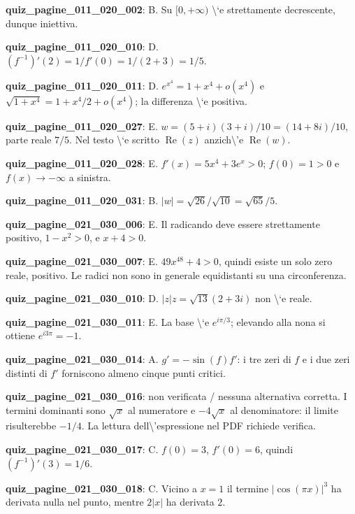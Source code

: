 \documentclass[11pt,a4paper]{article}
\newcounter{quiz}
\begin{document}
\noindent\textbf{quiz\_pagine\_011\_020\_002}: B. Su $[0,+\infty)$ \textbackslash{}`e strettamente decrescente, dunque iniettiva.\par\medskip
\noindent\textbf{quiz\_pagine\_011\_020\_010}: D. $(f^{-1})\prime(2)=1/f\prime(0)=1/(2+3)=1/5$.\par\medskip
\noindent\textbf{quiz\_pagine\_011\_020\_011}: D. $e^{x^4}=1+x^4+o(x^4)$ e $\sqrt{1+x^4}=1+x^4/2+o(x^4)$; la differenza \textbackslash{}`e positiva.\par\medskip
\noindent\textbf{quiz\_pagine\_011\_020\_027}: E. $w=(5+i)(3+i)/10=(14+8i)/10$, parte reale $7/5$. Nel testo \textbackslash{}`e scritto $\operatorname{Re}(z)$ anzich\textbackslash{}'e $\operatorname{Re}(w)$.\par\medskip
\noindent\textbf{quiz\_pagine\_011\_020\_028}: E. $f\prime(x)=5x^4+3e^x>0$; $f(0)=1>0$ e $f(x)\to-\infty$ a sinistra.\par\medskip
\noindent\textbf{quiz\_pagine\_011\_020\_031}: B. $|w|=\sqrt{26}/\sqrt{10}=\sqrt{65}/5$.\par\medskip
\noindent\textbf{quiz\_pagine\_021\_030\_006}: E. Il radicando deve essere strettamente positivo, $1-x^2>0$, e $x+4>0$.\par\medskip
\noindent\textbf{quiz\_pagine\_021\_030\_007}: E. $49x^{48}+4>0$, quindi esiste un solo zero reale, positivo. Le radici non sono in generale equidistanti su una circonferenza.\par\medskip
\noindent\textbf{quiz\_pagine\_021\_030\_010}: D. $|z|z=\sqrt{13}(2+3i)$ non \textbackslash{}`e reale.\par\medskip
\noindent\textbf{quiz\_pagine\_021\_030\_011}: E. La base \textbackslash{}`e $e^{i\pi/3}$; elevando alla nona si ottiene $e^{i3\pi}=-1$.\par\medskip
\noindent\textbf{quiz\_pagine\_021\_030\_014}: A. $g\prime=-\sin(f)f\prime$: i tre zeri di $f$ e i due zeri distinti di $f\prime$ forniscono almeno cinque punti critici.\par\medskip
\noindent\textbf{quiz\_pagine\_021\_030\_016}: non verificata / nessuna alternativa corretta. I termini dominanti sono $\sqrt{x}$ al numeratore e $-4\sqrt{x}$ al denominatore: il limite risulterebbe $-1/4$. La lettura dell\textbackslash{}'espressione nel PDF richiede verifica.\par\medskip
\noindent\textbf{quiz\_pagine\_021\_030\_017}: C. $f(0)=3$, $f\prime(0)=6$, quindi $(f^{-1})\prime(3)=1/6$.\par\medskip
\noindent\textbf{quiz\_pagine\_021\_030\_018}: C. Vicino a $x=1$ il termine $|\cos(\pi x)|^3$ ha derivata nulla nel punto, mentre $2|x|$ ha derivata $2$.\par\medskip
\end{document}
